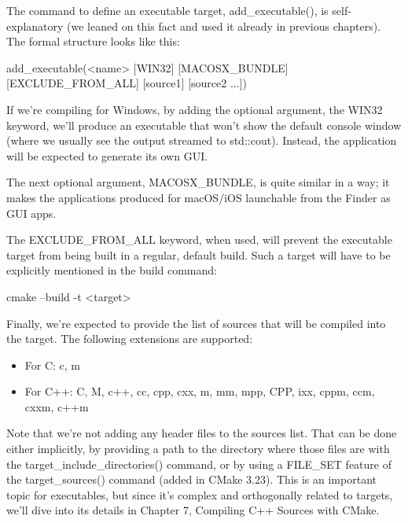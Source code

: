 
The command to define an executable target, add\_executable(), is self-explanatory (we leaned on this fact and used it already in previous chapters). The formal structure looks like this:

\begin{shell}
add_executable(<name> [WIN32] [MACOSX_BUNDLE]
                [EXCLUDE_FROM_ALL]
                [source1] [source2 ...])
\end{shell}

If we’re compiling for Windows, by adding the optional argument, the WIN32 keyword, we’ll produce an executable that won’t show the default console window (where we usually see the output streamed to std::cout). Instead, the application will be expected to generate its own GUI.

The next optional argument, MACOSX\_BUNDLE, is quite similar in a way; it makes the applications produced for macOS/iOS launchable from the Finder as GUI apps.

The EXCLUDE\_FROM\_ALL keyword, when used, will prevent the executable target from being built in a regular, default build. Such a target will have to be explicitly mentioned in the build command:

\begin{shell}
cmake --build -t <target>
\end{shell}

Finally, we’re expected to provide the list of sources that will be compiled into the target. The following extensions are supported:

\begin{itemize}
\item
For C: c, m

\item
For C++: C, M, c++, cc, cpp, cxx, m, mm, mpp, CPP, ixx, cppm, ccm, cxxm, c++m
\end{itemize}

Note that we’re not adding any header files to the sources list. That can be done either implicitly, by providing a path to the directory where those files are with the target\_include\_directories() command, or by using a FILE\_SET feature of the target\_sources() command (added in CMake 3.23). This is an important topic for executables, but since it’s complex and orthogonally related to targets, we’ll dive into its details in Chapter 7, Compiling C++ Sources with CMake.


